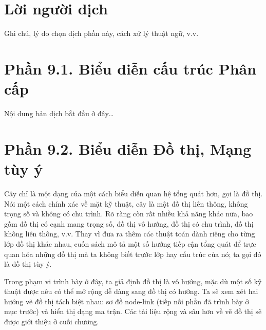 \documentclass[12pt,a4paper, openany]{book}
\begin{document}
\frontmatter
\tableofcontents

\chapter*{Lời người dịch}

Ghi chú, lý do chọn dịch phần này, cách xử lý thuật ngữ, v.v.

\mainmatter

\chapter*{Phần 9.1. \newline Biểu diễn cấu trúc Phân cấp}

Nội dung bản dịch bắt đầu ở đây\dots

\chapter*{Phần 9.2. \newline Biểu diễn Đồ thị, Mạng tùy ý}

Cây chỉ là một dạng của một cách biểu diễn quan hệ tổng quát hơn, gọi là đồ thị. Nói một cách chính xác về mặt kỹ thuật, cây là một đồ thị liên thông, không trọng số và không có chu trình. Rõ ràng còn rất nhiều khả năng khác nữa, bao gồm đồ thị có cạnh mang trọng số, đồ thị vô hướng, đồ thị có chu trình, đồ thị không liên thông, v.v. Thay vì đưa ra thêm các thuật toán dành riêng cho từng lớp đồ thị khác nhau, cuốn sách mô tả một số hướng tiếp cận tổng quát để trực quan hóa những đồ thị mà ta không biết trước lớp hay cấu trúc của nó; ta gọi đó là đồ thị tùy ý. 

Trong phạm vi trình bày ở đây, ta giả định đồ thị là vô hướng, mặc dù một số kỹ thuật được nêu có thể mở rộng dễ dàng sang đồ thị có hướng. Ta sẽ xem xét hai hướng vẽ đồ thị tách biệt nhau: sơ đồ node-link (tiếp nối phần đã trình bày ở mục trước) và hiển thị dạng ma trận. Các tài liệu rộng và sâu hơn về vẽ đồ thị sẽ được giới thiệu ở cuối chương.
\end{document}
